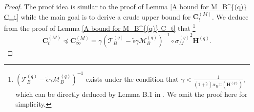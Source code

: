 \documentclass[11pt, letterpaper]{article}
\begin{document}
\begin{proof}
    The proof idea is similar to the proof of Lemma \ref{A bound for M_B^{(q)} C_t} while the main goal is to derive a crude upper bound for $\mathbf{C}_t^{(M)}$. We deduce from the proof of Lemma \ref{A bound for M_B^{(q)} C_t} that \footnote{$({\mathcal{T}_B^{(q)}}-\tilde{\epsilon}\gamma \mathcal{M}_B^{(q)})^{-1}$ exists under the condition that $\gamma < \frac{1}{(1+\tilde{\epsilon})\alpha_B\mathrm{tr}(\mathbf{H}^{(q)})}$, which can be directly deduced by Lemma B.1 in \citet{zou2023benign}. We omit the proof here for simplicity.}
    \begin{equation}
    \label{express CinftyM}
        \mathbf{C}_t^{(M)}\preceq \mathbf{C}_\infty^{(M)}=\gamma({\mathcal{T}_B^{(q)}}-\tilde{\epsilon}\gamma\mathcal{M}_B^{(q)})^{-1}\circ{\sigma_M^{(q)}}^2\mathbf{H}^{(q)}.
    \end{equation}
    

\end{proof}
\end{document}
